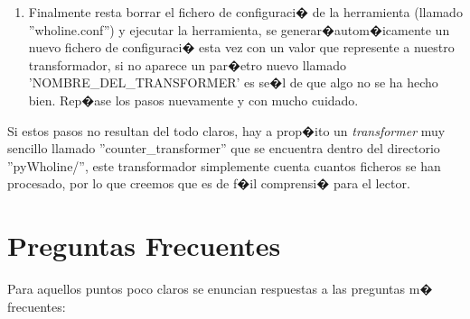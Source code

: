 \documentclass[a4paper,10pt]{book}
\begin{document}
\begin{enumerate}
Como el lector se ha percatado, se ha puesto como valor por defecto ''YES'', esto
quiere decir que cada vez que se ejecute la herramienta, nuestro transformador se
activar�y realizar�su trabajo, si no queremos que por defecto sea as� entonces
hay que poner ''NO'' en vez de ''YES'', poni�dolo siempre en maysculas.

Hay que tener cuidado de poner en 'NOMBRE\_DEL\_TRANSFORMER' exactamente el
mismo texto que se puso en la factor� de \textit{transformers}\footnote{Por complicar
las cosas, se puede poner un texto diferente, pero el sufijo siempre debe ser
''\_transformer''} y que no tiene espacios en blanco, para que de esta forma se
 pueda instanciar nuestro transformador, con la diferencia de que aqu�el texto puede ir en minsculas.

\item Finalmente resta borrar el fichero de configuraci� de la herramienta (llamado ''wholine.conf'')
y ejecutar la herramienta, se generar�autom�icamente un nuevo fichero de configuraci�
esta vez con un valor que represente a nuestro transformador, si no aparece un par�etro nuevo llamado
'NOMBRE\_DEL\_TRANSFORMER' es se�l de que algo no se ha hecho bien. Rep�ase los pasos
nuevamente y con mucho cuidado.
\end{enumerate}

Si estos pasos no resultan del todo claros, hay a prop�ito un \textit{transformer} muy
sencillo llamado ''counter\_transformer'' que se encuentra dentro del directorio
''pyWholine/'', este transformador simplemente cuenta cuantos ficheros se han procesado,
por lo que creemos que es de f�il comprensi� para el lector.

\section{Preguntas Frecuentes}

Para aquellos puntos poco claros se enuncian respuestas a las preguntas m�
frecuentes:
\end{document}
